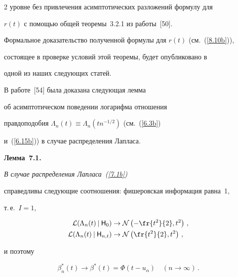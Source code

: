 \begin{multicols}{2}
уровне без привлечения асимптотических разложений формулу для


$r(t)$ с помощью общей теоремы~3.2.1 из работы~[50]. 


Формальное доказательство полученной формулы для $r(t)$ (см.~(\ref{8.10b})),


состоящее в проверке условий этой теоремы, будет опубликовано в


одной из наших следующих статей.





В работе~[54] была доказана следующая лемма


 об асимптотическом поведении логарифма отношения


правдоподобия $\Lambda_n(t) \equiv \Lambda_n(tn^{-1/2})$ (см.~(\ref{6.3b}) 


и~(\ref{6.15b})) в случае распределения Лапласа.





\vspace*{2pt}





\noindent


{\bf Лемма~7.1.} {\it В случае распределения Лапласа~(\ref{7.1b})


справедливы следующие соотношения: фишеровская информация равна~1,


т.\,е.\ $I=1$,


\begin{align*}


{\cal L}(\Lambda_n(t)\:|\:{\sf H}_0) & \to


{\cal N}\left (-\fr{t^2}{2}, t^2\right )\,,\\


{\cal L}(\Lambda_n(t)\:|\:{\sf H}_{n,t}) & \to {\cal N}\left(


\fr{t^2}{2}, t^2\right )\,,


\end{align*}


и поэтому}


$$


\beta_n^*(t) \to \beta^*(t)=\Phi(t-u_\alpha) \quad


(n \to \infty)\,.


$$ 


\pagebreak





\noindent



\end{multicols}
